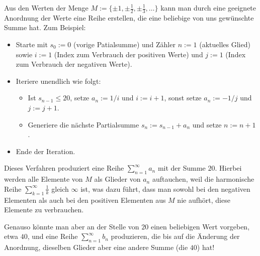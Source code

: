 \begin{bsp}
 Aus den  Werten der Menge  $M:=\{ \pm 1, \pm \frac{1}{2}, \pm \frac{1}{3}, \ldots \} $ kann man durch eine geeignete Anordnung der Werte eine Reihe erstellen, die eine beliebige von uns gewünschte Summe hat. Zum Beispiel: 
\begin{itemize}
	\item Starte mit $s_0:=0$ (vorige Patialsumme) und Zähler $n:=1$ (aktuelles Glied) sowie $i:=1$ (Index zum Verbrauch der positiven Werte) und $j:=1$ (Index zum Verbrauch der negativen Werte). 
	\item Iteriere unendlich wie folgt: 
	\begin{itemize} 
	\item[] Ist $s_{n-1} \le 20$,  setze $a_n := 1/i$ und $i:=i+1$, sonst setze $a_n:=-1/j$ und $j:=j+1$. 
	\item[] Generiere die nächste Partialsumme $s_n:=s_{n-1} + a_n$ und setze $n:=n+1$. 
	\end{itemize} 
	\item Ende der Iteration. 
\end{itemize} 
Dieses Verfahren produziert eine Reihe $\sum_{n=1}^\infty a_n$ mit der Summe $20$.  Hierbei werden alle Elemente von $M$ als Glieder von $a_n$ auftauchen, weil die harmonische Reihe $\sum_{k=1}^\infty \frac{1}{k}$ gleich $\infty$ ist, was dazu führt, dass man sowohl bei den negativen Elementen als auch bei den positiven Elementen aus $M$ nie aufhört, diese Elemente zu verbrauchen. 

Genauso könnte man aber an der Stelle von $20$ einen beliebigen Wert vorgeben, etwa $40$, und eine Reihe $\sum_{n=1}^\infty b_n$ produzieren, die bis auf die Änderung der Anordnung, dieselben Glieder aber eine andere Summe (die $40$) hat!
\end{bsp} 



